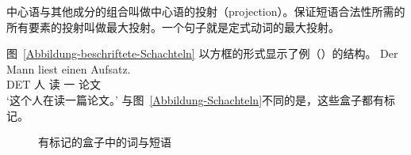 中心语与其他成分的组合叫做中心语的投射（projection）。保证短语合法性所需的所有要素的投射叫做最大投射。一个句子就是定式动词的最大投射。

图~\vref{Abbildung-beschriftete-Schachteln} 以方框的形式显示了例（）的结构。
\ea
\gll Der Mann liest einen Aufsatz.\\
	 DET  人 读 一 论文\\
\glt `这个人在读一篇论文。'
\z
与图~\ref{Abbildung-Schachteln}不同的是，这些盒子都有标记。
\begin{figure}
\centering
{}
\caption{\label{Abbildung-beschriftete-Schachteln}有标记的盒子中的词与短语}
\end{figure}%

